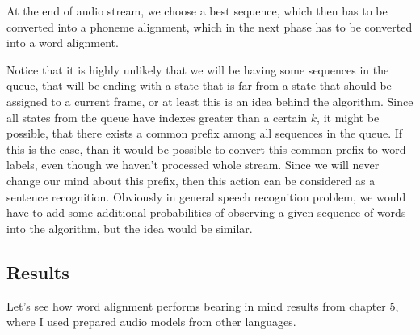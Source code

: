 \documentclass[12pt,a4paper,english]{article}
\begin{document}
At the end of audio stream, we choose a best sequence, which then has to be converted into a phoneme alignment, which in the next phase has to be converted into a word alignment. \newline

Notice that it is highly unlikely that we will be having some sequences in the queue, that will be ending with a state that is far from a state that should be assigned to a current frame, or at least this is an idea behind the algorithm. Since all states from the queue have indexes greater than a certain $k$, it might be possible, that there exists a common prefix among all sequences in the queue. If this is the case, than it would be possible to convert this common prefix to word labels, even though we haven't processed whole stream. Since we will never change our mind about this prefix, then this action can be considered as a sentence recognition. \newline
Obviously in general speech recognition problem, we would have to add some additional probabilities of observing a given sequence of words into the algorithm, but the idea would be similar.

\newpage

\subsection{Results}
Let's see how word alignment performs bearing in mind results from chapter 5, where I used prepared audio models from other languages. \newline
\end{document}
